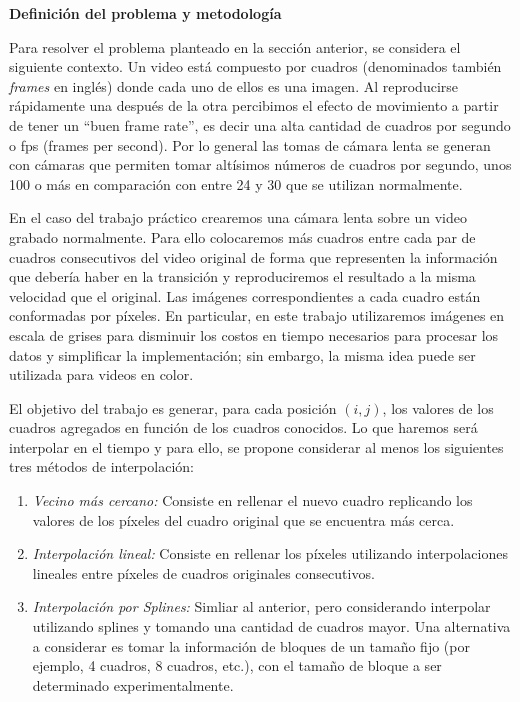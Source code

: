 \vskip 5pt

{\bf\noindent Definici\'on del problema y metodolog\'ia}

Para resolver el problema planteado en la secci\'on anterior, se considera el siguiente contexto. Un video está compuesto por cuadros (denominados también \textit{frames} en inglés) donde cada uno de ellos es una imagen. Al reproducirse rápidamente una después de la otra percibimos el efecto de movimiento a partir de tener un ``buen frame rate'', es decir una alta cantidad de cuadros por segundo o fps (frames per second). Por lo general las tomas de cámara lenta se generan con cámaras que permiten tomar altísimos números de cuadros por segundo, unos 100 o m\'as en comparaci\'on con entre 24 y 30 que se utilizan normalmente. 

En el caso del trabajo práctico crearemos una cámara lenta sobre un video grabado normalmente. Para ello colocaremos más cuadros entre cada par de cuadros consecutivos del video original de forma que representen la información que debería haber en la transición y reproduciremos el resultado a la misma velocidad que el original. Las im\'agenes correspondientes a cada cuadro est\'an conformadas por p\'ixeles. En particular, en este trabajo utilizaremos im\'agenes en escala de grises para disminuir los costos en tiempo necesarios para procesar los datos y simplificar la implementaci\'on; sin embargo, la misma idea puede ser utilizada para videos en color. 

El objetivo del trabajo es generar, para cada posici\'on $(i,j)$, los valores de los cuadros agregados en funci\'on de los cuadros conocidos. Lo que haremos ser\'a interpolar en el tiempo y para ello, se propone considerar al menos los siguientes tres m\'etodos de interpolaci\'on:

\begin{enumerate}
\item \emph{Vecino m\'as cercano:} Consiste en rellenar el nuevo cuadro replicando los valores de los p\'ixeles del cuadro original que se encuentra más cerca. \label{item:nn}
\item \emph{Interpolaci\'on lineal:} Consiste en rellenar los p\'ixeles utilizando interpolaciones lineales entre p\'ixeles de cuadros originales consecutivos. \label{item:lineal}
\item \emph{Interpolaci\'on por Splines:} Simliar al anterior, pero considerando interpolar utilizando splines y tomando una cantidad de cuadros mayor. Una alternativa a considerar es tomar la informaci\'on de bloques de un tama\~no fijo (por ejemplo, 4 cuadros, 8 cuadros, etc.), con el tama\~no de bloque a ser determinado experimentalmente. \label{item:spline}
\end{enumerate}


